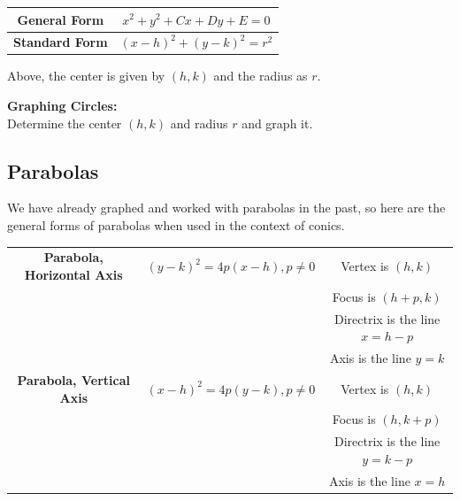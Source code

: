 \documentclass{article}
\begin{document}
    \begin{center}
        \begin{tabular} {|c|c|}
            \hline
            \textbf{General Form}
            & $x^2+y^2+Cx+Dy+E=0$   \\
            \hline
            \textbf{Standard Form}
            & $(x-h)^2+(y-k)^2=r^2$ \\
            \hline
        \end{tabular}
    \end{center}

    \noindent Above, the center is given by $(h,k)$ and the radius as $r$.

    \noindent \color{purple} \textbf{Graphing Circles:} \color{black} \\
    Determine the center $(h,k)$ and radius $r$ and graph it.

    \subsection{Parabolas}
    We have already graphed and worked with parabolas in the past, so here are the general
    forms of parabolas when used in the context of conics. \\

    \begin{center}
        \begin{tabular} {|c|c|c|}
            \hline
            \textbf{Parabola, Horizontal Axis}
            & $(y-k)^2=4p(x-h),p\not=0$
            & Vertex is $(h,k)$ \\
            & & Focus is $(h+p,k)$            \\
            & & Directrix is the line $x=h-p$ \\
            & & Axis is the line $y=k$        \\
            \hline
            \textbf{Parabola, Vertical Axis}
            & $(x-h)^2=4p(y-k),p\not=0$
            & Vertex is $(h,k)$ \\
            & & Focus is $(h,k+p)$            \\
            & & Directrix is the line $y=k-p$ \\
            & & Axis is the line $x=h$        \\
            \hline
        \end{tabular}
    \end{center}
\end{document}
